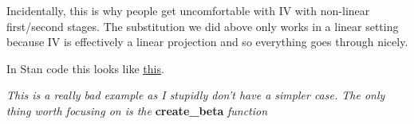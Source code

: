 \documentclass{article}
\begin{document}
Incidentally, this is why people get uncomfortable with IV with non-linear first/second 
stages. The substitution we did above only works in a linear setting because IV 
is effectively a linear projection and so everything goes through nicely.


In Stan code this looks like \href{https://gist.github.com/EdJeeOnGitHub/f728ac156da2d8dafa4dda8cd1a6b336}{this}.

\textit{This is a really bad example as I stupidly don't have a simpler case. The only 
thing worth focusing on is the } \textbf{create_beta} \textit{function}
\end{document}

